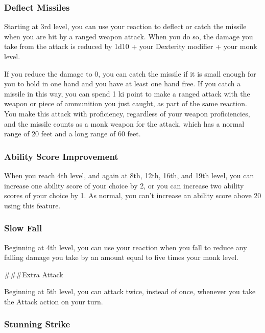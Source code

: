 \documentclass[
]{article}
\begin{document}
\hypertarget{deflect-missiles}{%
\subsubsection{Deflect Missiles}\label{deflect-missiles}}

Starting at 3rd level, you can use your reaction to deflect or catch the
missile when you are hit by a ranged weapon attack. When you do so, the
damage you take from the attack is reduced by 1d10 + your Dexterity
modifier + your monk level.

If you reduce the damage to 0, you can catch the missile if it is small
enough for you to hold in one hand and you have at least one hand free.
If you catch a missile in this way, you can spend 1 ki point to make a
ranged attack with the weapon or piece of ammunition you just caught, as
part of the same reaction. You make this attack with proficiency,
regardless of your weapon proficiencies, and the missile counts as a
monk weapon for the attack, which has a normal range of 20 feet and a
long range of 60 feet.

\hypertarget{ability-score-improvement}{%
\subsubsection{Ability Score
Improvement}\label{ability-score-improvement}}

When you reach 4th level, and again at 8th, 12th, 16th, and 19th level,
you can increase one ability score of your choice by 2, or you can
increase two ability scores of your choice by 1. As normal, you can't
increase an ability score above 20 using this feature.

\hypertarget{slow-fall}{%
\subsubsection{Slow Fall}\label{slow-fall}}

Beginning at 4th level, you can use your reaction when you fall to
reduce any falling damage you take by an amount equal to five times your
monk level.

\#\#\#Extra Attack

Beginning at 5th level, you can attack twice, instead of once, whenever
you take the Attack action on your turn.

\hypertarget{stunning-strike}{%
\subsubsection{Stunning Strike}\label{stunning-strike}}
\end{document}

